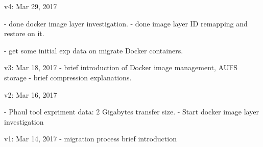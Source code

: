 v4: Mar 29, 2017
    
    - done docker image layer investigation.
    - done image layer ID remapping and restore on it.
    
    - get some initial exp data on migrate Docker containers.
    

v3: Mar 18, 2017
    - brief introduction of Docker image management, AUFS storage
    - brief compression explanations.
    
v2: Mar 16, 2017

    - Phaul tool expriment data: 2 Gigabytes transfer size. 
    - Start docker image layer investigation

v1: Mar 14, 2017
    - migration process brief introduction


\fi

